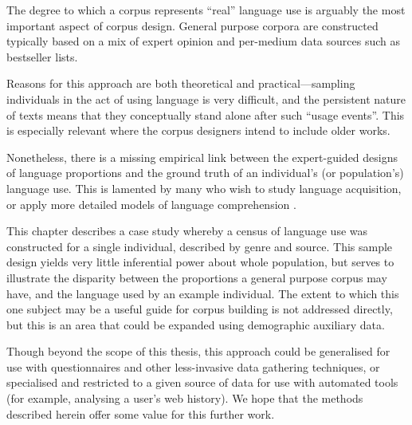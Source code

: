 The degree to which a corpus represents ``real'' language use is arguably the most important aspect of corpus design.  General purpose corpora are constructed typically based on a mix of expert opinion and per-medium data sources such as bestseller lists.


Reasons for this approach are both theoretical and practical---sampling individuals in the act of using language is very difficult, and the persistent nature of texts means that they conceptually stand alone after such ``usage events''.  This is especially relevant where the corpus designers intend to include older works.

Nonetheless, there is a missing empirical link between the expert-guided designs of language proportions and the ground truth of an individual's (or population's) language use.  This is lamented by many who wish to study language acquisition, or apply more detailed models of language comprehension .




This chapter describes a case study whereby a census of language use was constructed for a single individual, described by genre and source.  This sample design yields very little inferential power about whole population, but serves to illustrate the disparity between the proportions a general purpose corpus may have, and the language used by an example individual.  The extent to which this one subject may be a useful guide for corpus building is not addressed directly, but this is an area that could be expanded using demographic auxiliary data.

Though beyond the scope of this thesis, this approach could be generalised for use with questionnaires and other less-invasive data gathering techniques, or specialised and restricted to a given source of data for use with automated tools (for example, analysing a user's web history).  We hope that the methods described herein offer some value for this further work.

